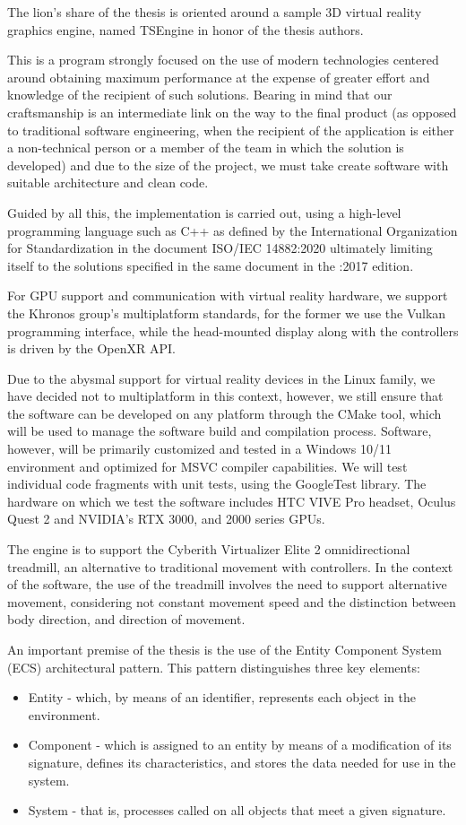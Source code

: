 The lion's share of the thesis is oriented around a sample 3D virtual reality graphics engine, named TSEngine in honor of the thesis authors.

This is a program strongly focused on the use of modern technologies centered around obtaining maximum performance at the expense of greater effort and knowledge of the recipient of such solutions. Bearing in mind that our craftsmanship is an intermediate link on the way to the final product (as opposed to traditional software engineering, when the recipient of the application is either a non-technical person or a member of the team in which the solution is developed) and due to the size of the project, we must take create software with suitable architecture and clean code.

Guided by all this, the implementation is carried out, using a high-level programming language such as C++ as defined by the International Organization for Standardization in the document ISO/IEC 14882:2020 ultimately limiting itself to the solutions specified in the same document in the :2017 edition.

For GPU support and communication with virtual reality hardware, we support the Khronos group's multiplatform standards, for the former we use the Vulkan programming interface, while the head-mounted display along with the controllers is driven by the OpenXR API.

Due to the abysmal support for virtual reality devices in the Linux family, we have decided not to multiplatform in this context, however, we still ensure that the software can be developed on any platform through the CMake tool, which will be used to manage the software build and compilation process. Software, however, will be primarily customized and tested in a Windows 10/11 environment and optimized for MSVC compiler capabilities. We will test individual code fragments with unit tests, using the GoogleTest library. The hardware on which we test the software includes HTC VIVE Pro headset, Oculus Quest 2 and NVIDIA's RTX 3000, and 2000 series GPUs.

The engine is to support the Cyberith Virtualizer Elite 2 omnidirectional treadmill, an alternative to traditional movement with controllers. In the context of the software, the use of the treadmill involves the need to support alternative movement, considering not constant movement speed and the distinction between body direction, and direction of movement.

An important premise of the thesis is the use of the Entity Component System (ECS) architectural pattern. This pattern distinguishes three key elements:
\begin{itemize}
    \item Entity - which, by means of an identifier, represents each object in the environment.
    \item Component - which is assigned to an entity by means of a modification of its signature, defines its characteristics, and stores the data needed for use in the system.
    \item System - that is, processes called on all objects that meet a given signature.
\end{itemize}

